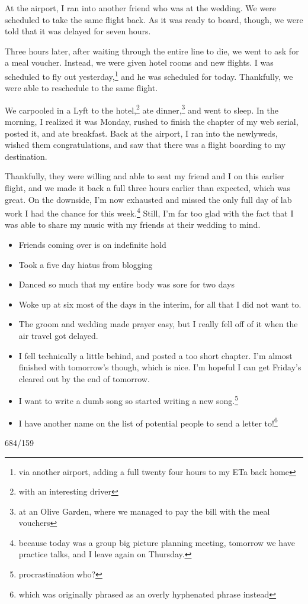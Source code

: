\documentclass[12pt]{article}[titlepage]
\newcommand{\1}{\={a}}
\newcommand{\2}{\={e}}
\newcommand{\3}{\={\i}}
\newcommand{\4}{\=o}
\newcommand{\5}{\=u}
\newcommand{\6}{\={A}}
\renewcommand{\,}{\textsuperscript{,}}
\begin{document}
At the airport, I ran into another friend who was at the wedding.
We were scheduled to take the same flight back.
As it was ready to board, though, we were told that it was delayed for seven hours.

Three hours later, after waiting through the entire line to die, we went to ask for a meal voucher.
Instead, we were given hotel rooms and new flights.
I was scheduled to fly out yesterday,\footnote{via another airport, adding a full twenty four hours to my ETa back home} and he was scheduled for today.
Thankfully, we were able to reschedule to the same flight.

We carpooled in a Lyft to the hotel,\footnote{with an interesting driver} ate dinner,\footnote{at an Olive Garden, where we managed to pay the bill with the meal vouchers} and went to sleep.
In the morning, I realized it was Monday, rushed to finish the chapter of my web serial, posted it, and ate breakfast.
Back at the airport, I ran into the newlyweds, wished them congratulations, and saw that there was a flight boarding to my destination.

Thankfully, they were willing and able to seat my friend and I on this earlier flight, and we made it back a full three hours earlier than expected, which was great.
On the downside, I'm now exhausted and missed the only full day of lab work I had the chance for this week.\footnote{because today was a group big picture planning meeting, tomorrow we have practice talks, and I leave again on Thursday.}
Still, I'm far too glad with the fact that I was able to share my music with my friends at their wedding to mind.

\begin{itemize}
\item Friends coming over is on indefinite hold
\item Took a five day hiatus from blogging
\item Danced so much that my entire body was sore for two days
\item Woke up at six most of the days in the interim, for all that I did not want to.
\item The groom and wedding made prayer easy, but I really fell off of it when the air travel got delayed.
\item I fell technically a little behind, and posted a too short chapter. I'm almost finished with tomorrow's though, which is nice. I'm hopeful I can get Friday's cleared out by the end of tomorrow.
\item I want to write a dumb song so started writing a new song.\footnote{procrastination who?}
\item I have another name on the list of potential people to send a letter to!\footnote{which was originally phrased as an overly hyphenated phrase instead}
\end{itemize}

684/159
\end{document}
